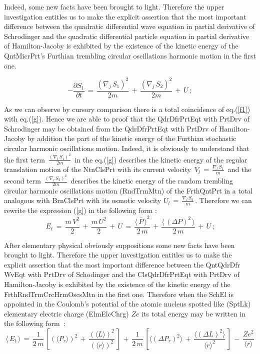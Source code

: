 \documentclass[12pt]{article}
\begin{document}
 Indeed, some new facts have been brought to light. Therefore the upper
investigation entitles us to make the explicit assertion that the most
important difference between the quadratic differential wave equation in
partial derivative of Schrodinger and the quadratic differential particle
equation in partial derivative of Hamilton-Jacoby is exhibited by the
existence of the kinetic energy of the QntMicrPrt's Furthian trembling
circular oscillations harmonic motion in the first one.

\begin{equation}\label{g}
 -\frac{\partial S_1}{\partial t}\,=\,\frac{(\nabla_j\,S_1)^2}{2m}\,+
\,\frac{(\nabla_j\,S_2)^2}{2m}\,+\,U\,;
\end{equation}

 As we can observe by cursory comparison there is a total coincidence of
eq.(\ref{f1}) with eq.(\ref{g}). Hence we are able to proof that the
QdrDfrPrtEqt with PrtDrv of Schrodinger may be obtained from the
QdrDfrPrtEqt with PrtDrv of Hamilton-Jacoby by addition the part of the
kinetic energy of the Furthian stochastic circular harmonic oscillations
motion. Indeed, it is obviously to understand that the first term
$\,\frac{(\nabla_l\,S_1)^2} {2m}\,$ in the eq.(\ref{g}) describes the
kinetic energy of the regular translation motion of the NtnClsPrt with
its current velocity $\,V_l\,=\,\frac{\nabla_l\,S_1}{m}\,$ and the second
term $\,\frac{(\nabla_l\,S_2)^2}{2m}\,$ describes the kinetic energy of the
random trembling circular harmonic oscillations motion (RndTrmMtn) of the
FrthQntPrt in a total analogous with BrnClsPrt with its osmotic velocity
$U_l\,=\,\frac{\nabla_l\,S_2}{m}\,$. Therefore we can rewrite the expression
(\ref{g}) in the following form :
\begin{equation}\label{h}
\,E_t\,=\,\frac{m\,V^2}{2}\,+\,\frac{m\,U^2}{2}\,+\,U\,=
\,\frac{{\langle\,\bar P\,\rangle}^2}{2\,m}\,+
\,\frac{\langle\,(\Delta P)^2\,\rangle}{2\,m}\,+\,U\,;
\end{equation}

 After elementary physical obviously suppositions some new facts have been
brought to light. Therefore the upper investigation entitles us to make the
explicit assertion that the most important difference between the QntQdrDfr
WvEqt with PrtDrv of Schodinger and the ClsQdrDfrPrtEqt with PrtDrv of
Hamilton-Jacoby is exhibited by the existence of the kinetic energy of the
FrthRndTrmCrcHrmOscsMtn in the first one. Therefore when the SchEl is
appointed in the Coulomb's potential of the atomic nucleus spotted like
(SptLk) elementary electric charge (ElmElcChrg) $Ze$ its total energy may be
written in the following form \,:
\begin{equation}\label{i}
\langle\,E_t\,\rangle\,=\,\frac{1}{2\,m}\,\left[(\langle P_r \rangle)^2\,+
\,\frac{(\langle L \rangle)^2}{(\langle r \rangle)^2}\,\right]\,+
\,\frac{1}{2\,m}\,\left[\langle(\Delta P_r)^2 \rangle\,+
\,\frac{\langle(\Delta L)^2 \rangle}{\langle r \rangle^2}\,\right]\,-
\,\frac{Z e^2}{\langle r \rangle}
\end{equation}
\end{document}
